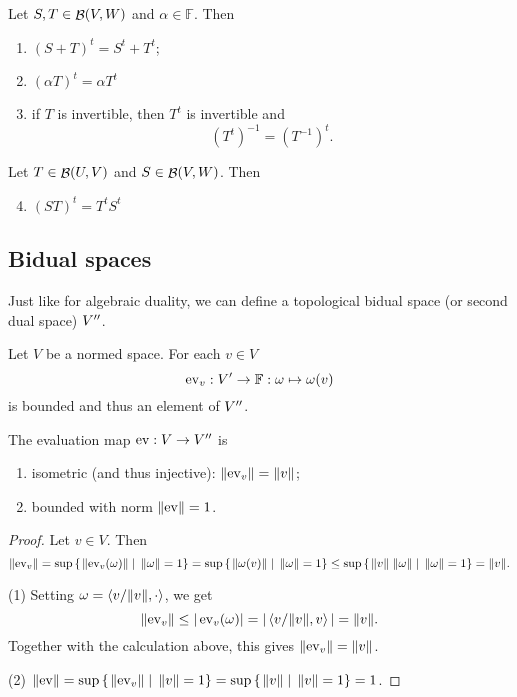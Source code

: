 \begin{lemma}
Let $S,T\in\mathop{\mathcal{B}}(V,W)$ and $\alpha\in\mathbb{F}$. Then
\begin{enumerate}
\item $(S+T)^t = S^t+T^t$;
\item $(\alpha T)^t = \alpha T^t$
\item if $T$ is invertible, then $T^t$ is invertible and
\[ (T^t)^{-1} = (T^{-1})^t. \]
\end{enumerate}
Let $T\in\mathop{\mathcal{B}}(U,V)$ and $S\in\mathop{\mathcal{B}}(V,W)$. Then
\begin{enumerate}
\setcounter{enumi}{3}
\item $(ST)^t = T^tS^t$
\end{enumerate}
\end{lemma}

\subsection{Bidual spaces}
Just like for algebraic duality, we can define a topological bidual space (or second dual space) ${V}^{\prime\prime}$.

\begin{proposition}
Let $V$ be a normed space. 
For each $v\in V$
\[ \operatorname{ev}_v: {V}^\prime \to \mathbb{F}: \omega \mapsto \omega(v) \]
is bounded and thus an element of ${V}^{\prime\prime}$.

The evaluation map $\operatorname{ev}: V \to {V}^{\prime\prime}$ is
\begin{enumerate}
\item isometric (and thus injective): $\lVert\operatorname{ev}_v\rVert = \lVert v\rVert$;
\item bounded with norm $\lVert\operatorname{ev}\rVert = 1$.
\end{enumerate}
\end{proposition}
\begin{proof}
Let $v\in V$. Then
\[ \lVert\operatorname{ev}_v\rVert = \sup\left\{\left. \lVert\operatorname{ev}_v(\omega)\rVert \;\right|\; \lVert\omega\rVert=1 \right\} = \sup\left\{\left. \lVert\omega(v)\rVert \;\right|\; \lVert\omega\rVert=1 \right\} \leq \sup\left\{\left. \lVert v\rVert\;\lVert\omega\rVert \;\right|\; \lVert\omega\rVert=1 \right\} = \lVert v\rVert. \]

(1) Setting $\omega = \left\langle v/\lVert v\rVert, \cdot \right\rangle$, we get
\[ \lVert\operatorname{ev}_v\rVert \leq |\operatorname{ev}_v(\omega)| = |\left\langle v/\lVert v\rVert, v \right\rangle| = \lVert v\rVert. \]
Together with the calculation above, this gives $\lVert\operatorname{ev}_v\rVert = \lVert v\rVert$.

(2) $\lVert\operatorname{ev}\rVert = \sup\left\{\left. \lVert\operatorname{ev}_v\rVert \;\right|\; \lVert v\rVert=1 \right\} = \sup\left\{\left. \lVert v\rVert \;\right|\; \lVert v\rVert=1 \right\} = 1$.
\end{proof}

